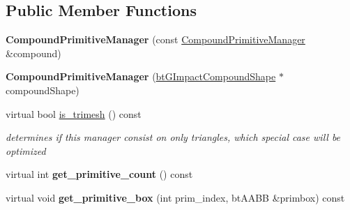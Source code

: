 \subsection*{Public Member Functions}
\begin{DoxyCompactItemize}
\item 
\mbox{\label{classbtGImpactCompoundShape_1_1CompoundPrimitiveManager_a5539cca68e6315d315bbc391373c5c00}} 
{\bfseries Compound\+Primitive\+Manager} (const \hyperlink{classbtGImpactCompoundShape_1_1CompoundPrimitiveManager}{Compound\+Primitive\+Manager} \&compound)
\item 
\mbox{\label{classbtGImpactCompoundShape_1_1CompoundPrimitiveManager_a52742fa7366e3b923cfbd5fc64a3e3a7}} 
{\bfseries Compound\+Primitive\+Manager} (\hyperlink{classbtGImpactCompoundShape}{bt\+G\+Impact\+Compound\+Shape} $\ast$compound\+Shape)
\item 
\mbox{\label{classbtGImpactCompoundShape_1_1CompoundPrimitiveManager_a8d1c24ad98166744555f34b2b65bca8d}} 
virtual bool \hyperlink{classbtGImpactCompoundShape_1_1CompoundPrimitiveManager_a8d1c24ad98166744555f34b2b65bca8d}{is\+\_\+trimesh} () const
\begin{DoxyCompactList}\small\item\em determines if this manager consist on only triangles, which special case will be optimized \end{DoxyCompactList}\item 
\mbox{\label{classbtGImpactCompoundShape_1_1CompoundPrimitiveManager_a45ad8b8bd0ef21f12bf8d459bf1cc4e7}} 
virtual int {\bfseries get\+\_\+primitive\+\_\+count} () const
\item 
\mbox{\label{classbtGImpactCompoundShape_1_1CompoundPrimitiveManager_a86c14dffc631e4507c2de85bebcdd788}} 
virtual void {\bfseries get\+\_\+primitive\+\_\+box} (int prim\+\_\+index, bt\+A\+A\+BB \&primbox) const
\item 
\mbox{\label{classbtGImpactCompoundShape_1_1CompoundPrimitiveManager_ae6937811f4217de508b7fa9304212a3d}} 

\end{DoxyCompactItemize}
